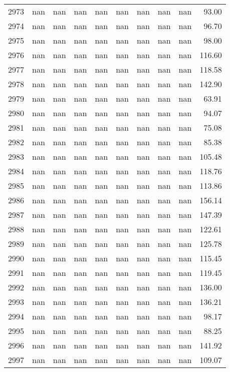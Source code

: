 \begin{tabular}{lrrrrrrrrr}
2973 & nan & nan & nan & nan & nan & nan & nan & nan & 93.00 \\
2974 & nan & nan & nan & nan & nan & nan & nan & nan & 96.70 \\
2975 & nan & nan & nan & nan & nan & nan & nan & nan & 98.00 \\
2976 & nan & nan & nan & nan & nan & nan & nan & nan & 116.60 \\
2977 & nan & nan & nan & nan & nan & nan & nan & nan & 118.58 \\
2978 & nan & nan & nan & nan & nan & nan & nan & nan & 142.90 \\
2979 & nan & nan & nan & nan & nan & nan & nan & nan & 63.91 \\
2980 & nan & nan & nan & nan & nan & nan & nan & nan & 94.07 \\
2981 & nan & nan & nan & nan & nan & nan & nan & nan & 75.08 \\
2982 & nan & nan & nan & nan & nan & nan & nan & nan & 85.38 \\
2983 & nan & nan & nan & nan & nan & nan & nan & nan & 105.48 \\
2984 & nan & nan & nan & nan & nan & nan & nan & nan & 118.76 \\
2985 & nan & nan & nan & nan & nan & nan & nan & nan & 113.86 \\
2986 & nan & nan & nan & nan & nan & nan & nan & nan & 156.14 \\
2987 & nan & nan & nan & nan & nan & nan & nan & nan & 147.39 \\
2988 & nan & nan & nan & nan & nan & nan & nan & nan & 122.61 \\
2989 & nan & nan & nan & nan & nan & nan & nan & nan & 125.78 \\
2990 & nan & nan & nan & nan & nan & nan & nan & nan & 115.45 \\
2991 & nan & nan & nan & nan & nan & nan & nan & nan & 119.45 \\
2992 & nan & nan & nan & nan & nan & nan & nan & nan & 136.00 \\
2993 & nan & nan & nan & nan & nan & nan & nan & nan & 136.21 \\
2994 & nan & nan & nan & nan & nan & nan & nan & nan & 98.17 \\
2995 & nan & nan & nan & nan & nan & nan & nan & nan & 88.25 \\
2996 & nan & nan & nan & nan & nan & nan & nan & nan & 141.92 \\
2997 & nan & nan & nan & nan & nan & nan & nan & nan & 109.07 \\

\end{tabular}

